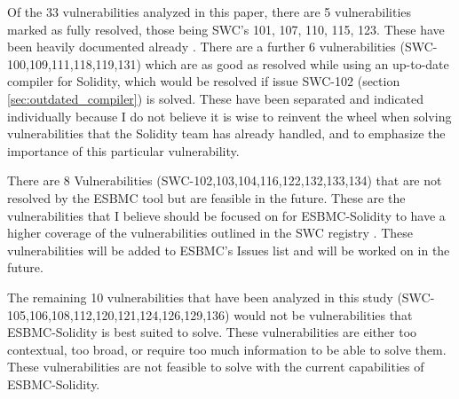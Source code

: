 Of the 33 vulnerabilities analyzed in this paper, there are 5 vulnerabilities marked as fully resolved, those being SWC's 101, 107, 110, 115, 123. These have been heavily documented already \cite{salim2022esbmc}. There are a further 6 vulnerabilities (SWC-100,109,111,118,119,131) which are as good as resolved while using an up-to-date compiler for Solidity, which would be resolved if issue SWC-102 (section \ref{sec:outdated_compiler}) is solved. These have been separated and indicated individually because I do not believe it is wise to reinvent the wheel when solving vulnerabilities that the Solidity team has already handled, and to emphasize the importance of this particular vulnerability.

There are 8 Vulnerabilities (SWC-102,103,104,116,122,132,133,134) that are not resolved by the ESBMC tool but are feasible in the future. These are the vulnerabilities that I believe should be focused on for ESBMC-Solidity to have a higher coverage of the vulnerabilities outlined in the SWC registry \cite{swc}. These vulnerabilities will be added to ESBMC's Issues list \cite{esbmc_issues} and will be worked on in the future.

The remaining 10 vulnerabilities that have been analyzed in this study (SWC-105,106,108,112,120,121,124,126,129,136) would not be vulnerabilities that ESBMC-Solidity is best suited to solve. These vulnerabilities are either too contextual, too broad, or require too much information to be able to solve them. These vulnerabilities are not feasible to solve with the current capabilities of ESBMC-Solidity.


